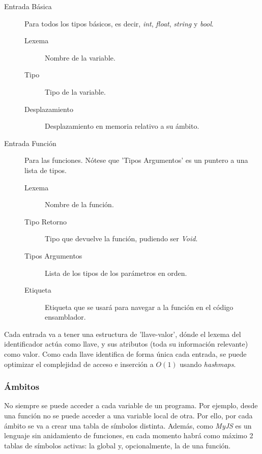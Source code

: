 \documentclass[a4paper]{CSMakotoTechnicalReport}
\begin{document}
    \begin{description}
        \item[Entrada Básica] Para todos los tipos básicos, es decir, \textit{int}, \textit{float}, \textit{string} y \textit{bool}.
            \begin{description}
                \item[Lexema] Nombre de la variable.
                \item[Tipo] Tipo de la variable.
                \item[Desplazamiento] Desplazamiento en memoria relativo a su ámbito.
            \end{description}

        \item[Entrada Función] Para las funciones. Nótese que 'Tipos Argumentos' es un puntero a una lista de tipos.
            \begin{description}
                \item[Lexema] Nombre de la función.
                \item[Tipo Retorno] Tipo que devuelve la función, pudiendo ser \textit{Void}.
                \item[Tipos Argumentos] Lista de los tipos de los parámetros en orden.
                \item[Etiqueta] Etiqueta que se usará para navegar a la función en el código ensamblador.
            \end{description}
    \end{description}

    Cada entrada va a tener una estructura de 'llave-valor', dónde el lexema del identificador actúa como llave, y sus atributos (toda su información relevante) como valor. Como cada llave identifica de forma única cada entrada, se puede optimizar el complejidad de acceso e inserción a $O(1)$ usando \textit{hashmaps}.


    \subsubsection{Ámbitos}

    No siempre se puede acceder a cada variable de un programa. Por ejemplo, desde una función no se puede acceder a una variable local de otra. Por ello, por cada ámbito se va a crear una tabla de símbolos distinta. Además, como \textit{MyJS} es un lenguaje sin anidamiento de funciones, en cada momento habrá como máximo 2 tablas de símbolos activas: la global y, opcionalmente, la de una función.
    
\end{document}
